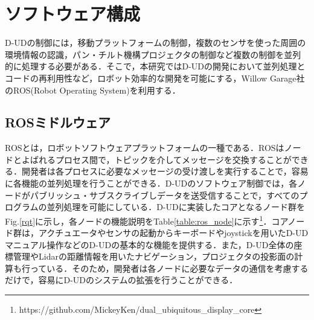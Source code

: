 \documentclass[12pt]{sonota/aislab}
\begin{document}


\section{ソフトウェア構成}
D-UDの制御には，移動プラットフォームの制御，複数のセンサを使った周囲の環境情報の認識，パン・チルト機構プロジェクタの制御など複数の制御を並列的に処理する必要がある．そこで，本研究ではD-UDの開発において並列処理とコードの再利用性など，ロボット効率的な開発を可能にする，Willow Garage社のROS(Robot Operating System)\cite{ROS}を利用する．

\subsection{ROSミドルウェア}
ROSとは，ロボットソフトウェアプラットフォームの一種である．ROSはノードとよばれるプロセス間で，トピックを介してメッセージを交換することができる．開発者は各プロセスに必要なメッセージの受け渡しを実行することで，容易に各機能の並列処理を行うことができる．D-UDのソフトウェア制御では，各ノードがパブリッシュ・サブスクライブしデータを送受信することで，すべてのプログラムの並列処理を可能にしている．D-UDに実装したコアとなるノード群をFig.\ref{rqt}に示し，各ノードの機能説明をTable\ref{table:ros_node}に示す\footnote{https://github.com/MickeyKen/dual\_ubiquitous\_display\_core}．コアノード群は，アクチュエータやセンサの起動からキーボードやjoystickを用いたD-UDマニュアル操作などのD-UDの基本的な機能を提供する．また，D-UD全体の座標管理やLidarの距離情報を用いたナビゲーション，プロジェクタの投影面の計算も行っている．そのため，開発者は各ノードに必要なデータの通信を考慮するだけで，容易にD-UDのシステムの拡張を行うことができる．
\end{document}
